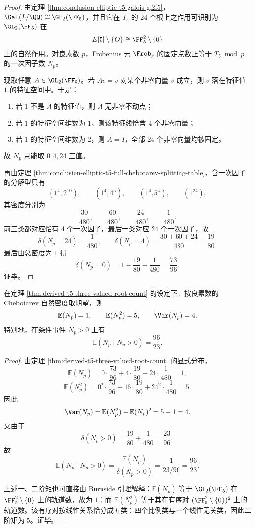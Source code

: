 \begin{proof}
由定理 \ref{thm:conclusion-elliptic-t5-galois-gl2f5}，\(\Gal(L/\QQ)\cong \GL_2(\FF_5)\)，并且它在 \(T_5\) 的 \(24\) 个根上之作用可识别为 \(\GL_2(\FF_5)\) 在
\[
E[5]\setminus\{O\}\cong \FF_5^2\setminus\{0\}
\]
上的自然作用。对良素数 \(p\)，Frobenius 元 \(\Frob_p\) 的固定点数正等于 \(T_5\bmod p\) 的一次因子数 \(N_p\)。

现取任意 \(A\in\GL_2(\FF_5)\)。若 \(Av=v\) 对某个非零向量 \(v\) 成立，则 \(v\) 落在特征值 \(1\) 的特征空间中。于是：
\begin{enumerate}
  \item 若 \(1\) 不是 \(A\) 的特征值，则 \(A\) 无非零不动点；
  \item 若 \(1\) 的特征空间维数为 \(1\)，则该特征线恰含 \(4\) 个非零向量；
  \item 若 \(1\) 的特征空间维数为 \(2\)，则 \(A=I\)，全部 \(24\) 个非零向量均被固定。
\end{enumerate}
故 \(N_p\) 只能取 \(0,4,24\) 三值。

再由定理 \ref{thm:conclusion-elliptic-t5-full-chebotarev-splitting-table}，含一次因子的分解型只有
\[
(1^4,2^{10}),\qquad
(1^4,4^5),\qquad
(1^4,5^4),\qquad
(1^{24}),
\]
其密度分别为
\[
\frac{30}{480},\qquad
\frac{60}{480},\qquad
\frac{24}{480},\qquad
\frac{1}{480}.
\]
前三类都对应恰有 \(4\) 个一次因子，最后一类对应 \(24\) 个一次因子，故
\[
\delta(N_p=24)=\frac{1}{480},
\qquad
\delta(N_p=4)=\frac{30+60+24}{480}=\frac{19}{80}.
\]
最后由总密度为 \(1\) 得
\[
\delta(N_p=0)=1-\frac{19}{80}-\frac{1}{480}=\frac{73}{96}.
\]
证毕。
\end{proof}

\begin{corollary}\label{cor:derived-t5-burnside-moments}
在定理 \ref{thm:derived-t5-three-valued-root-count} 的设定下，按良素数的 Chebotarev 自然密度取期望，则
\[
\mathbb E(N_p)=1,
\qquad
\mathbb E(N_p^2)=5,
\qquad
\Var(N_p)=4.
\]
特别地，在条件事件 \(N_p>0\) 上有
\[
\mathbb E(N_p\mid N_p>0)=\frac{96}{23}.
\]
\end{corollary}

\begin{proof}
由定理 \ref{thm:derived-t5-three-valued-root-count} 的显式分布，
\[
\mathbb E(N_p)
=
0\cdot \frac{73}{96}
+4\cdot \frac{19}{80}
+24\cdot \frac{1}{480}
=1,
\]
\[
\mathbb E(N_p^2)
=
0^2\cdot \frac{73}{96}
+16\cdot \frac{19}{80}
+24^2\cdot \frac{1}{480}
=5.
\]
因此
\[
\Var(N_p)=\mathbb E(N_p^2)-\mathbb E(N_p)^2=5-1=4.
\]
又由于
\[
\delta(N_p>0)=\frac{19}{80}+\frac{1}{480}=\frac{23}{96},
\]
故
\[
\mathbb E(N_p\mid N_p>0)
=
\frac{\mathbb E(N_p)}{\delta(N_p>0)}
=
\frac{1}{23/96}
=
\frac{96}{23}.
\]

上述一、二阶矩也可直接由 Burnside 引理解释：\(\mathbb E(N_p)\) 等于 \(\GL_2(\FF_5)\) 在 \(\FF_5^2\setminus\{0\}\) 上的轨道数，故为 \(1\)；而 \(\mathbb E(N_p^2)\) 等于其在有序对 \((\FF_5^2\setminus\{0\})^2\) 上的轨道数。该有序对按线性关系恰分成五类：四个比例类与一个线性无关类，因此二阶矩为 \(5\)。证毕。
\end{proof}
